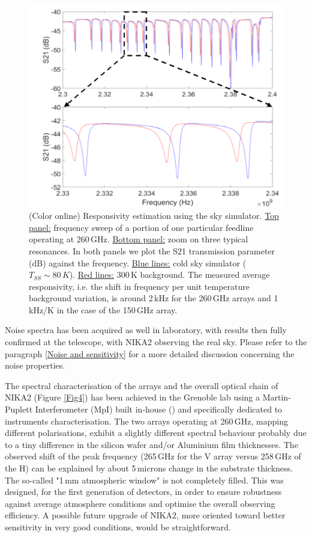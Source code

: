 \documentclass[]{aa} %
\begin{document}
\begin{figure}[h]
\begin{center}
   \centering
    \includegraphics[width=1.0\linewidth]{260GHz-H_sky.png}
    \caption{(Color online) Responsivity estimation using the sky simulator. \underline{Top panel:} frequency sweep of a portion of one particular feedline operating at 260\,GHz. \underline{Bottom panel:} zoom on three typical resonances. In both panels we plot the S21 transmission parameter (dB) against the frequency. \underline{Blue lines:} cold sky simulator ($T_{SS} \sim 80\,K$). \underline{Red lines:} 300\,K background. The measured average responsivity, i.e. the shift in frequency per unit temperature background variation, is around 2\,kHz for the 260\,GHz arrays and 1\,kHz/K in the case of the 150\,GHz array.}
         \label{Shift_f}
\end{center}
\end{figure}

Noise spectra has been acquired as well in laboratory, with results then fully confirmed at the telescope, with NIKA2 observing the real sky. Please refer to the paragraph \ref{Noise and sensitivity} for a more detailed discussion concerning the noise properties. 

The spectral characterisation of the arrays and the overall optical chain of NIKA2 (Figure \ref{Fig4}) has been achieved in the Grenoble lab using a Martin-Puplett Interferometer (MpI) built in-house (\cite{Durand2008}) and specifically dedicated to instruments characterisation. The two arrays operating at 260\,GHz, mapping different polarisations, exhibit a slightly different spectral behaviour probably due to a tiny difference in the silicon wafer and/or Aluminium film thicknesses. The observed shift of the peak frequency (265\,GHz for the V array versus 258\,GHz of the H) can be explained by about 5\,microns change in the substrate thickness. The so-called "1\,mm atmospheric window" is not completely filled. This was designed, for the first generation of detectors, in order to ensure robustness against average atmosphere conditions and optimise the overall observing efficiency. A possible future upgrade of NIKA2, more oriented toward better sensitivity in very good conditions, would be straightforward. 
\end{document}
